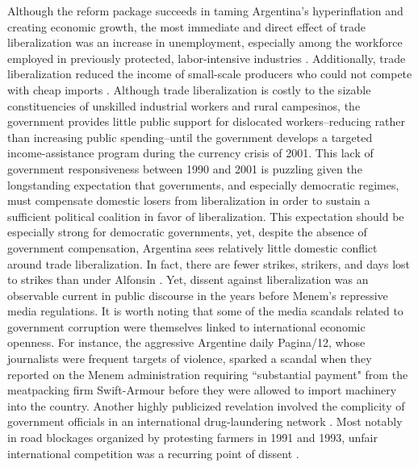 \documentclass[12pt,a4paper]{article}\usepackage[]{graphicx}\usepackage[]{color}
\begin{document}
Although the reform package succeeds in taming Argentina's hyperinflation and creating economic growth, the most immediate and direct effect of trade liberalization was an increase in unemployment, especially among the workforce employed in previously protected, labor-intensive industries \parencite[10]{Beker:2011vq}. Additionally, trade liberalization reduced the income of small-scale producers who could not compete with cheap imports \parencite{eckstein2001power}. Although trade liberalization is costly to the sizable constituencies of unskilled industrial workers and rural campesinos, the government provides little public support for dislocated workers--reducing rather than increasing public spending--until the government develops a targeted income-assistance program during the currency crisis of 2001. This lack of government responsiveness between 1990 and 2001 is puzzling given the longstanding expectation that governments, and especially democratic regimes, must compensate domestic losers from liberalization in order to sustain a sufficient political coalition in favor of liberalization. This expectation should be especially strong for democratic governments, yet, despite the absence of government compensation, Argentina sees relatively little domestic conflict around trade liberalization. In fact, there are fewer strikes, strikers, and days lost to strikes than under Alfonsin \parencite{eckstein2001power}. Yet, dissent against liberalization was an observable current in public discourse in the years before Menem's repressive media regulations. It is worth noting that some of the media scandals related to government corruption were themselves linked to international economic openness. For instance, the aggressive Argentine daily Pagina/12, whose journalists were frequent targets of violence, sparked a scandal when they reported on the Menem administration requiring ``substantial payment" from the meatpacking firm Swift-Armour before they were allowed to import machinery into the country. Another highly publicized revelation involved the complicity of government officials in an international drug-laundering network \parencite{Waisbord:1994kq}. Most notably in road blockages organized by protesting farmers in 1991 and 1993, unfair international competition was a recurring point of dissent \parencites{McCullough:1991cs}{Ferber:1993fb}.
\end{document}
